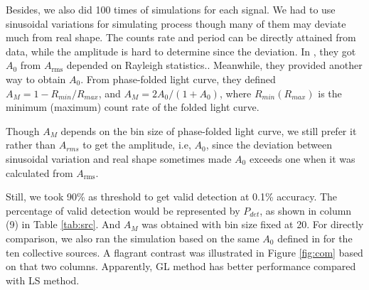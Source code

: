 \documentclass[fleqn,usenatbib]{mnras}
\begin{document}
Besides, we also did 100 times of simulations for each signal. We had to use sinusoidal variations for simulating process though many of them may deviate much from real shape. The counts rate and period can be directly attained from data, while the amplitude is hard to determine since the deviation. In \citet{2012ApJ...746..165H}, they got $A_0$ from $A_{\mathrm{rms}}$ depended on Rayleigh statistics.\citep{1983A&A...128..245B,2003ApJ...599..465M}.
Meanwhile, they provided another way to obtain $A_0$. From phase-folded light curve, they defined $A_{M}={1-R_{min}}/R_{max}$, and $A_{M}=2A_0/({1+A_0})$, where $R_{min}(R_{max})$ is the minimum (maximum) count rate of the folded light curve. 

Though $A_{M}$ depends on the bin size of phase-folded light curve, we still prefer it rather than $A_{rms}$ to get the amplitude, i.e, $A_0$, since the deviation between sinusoidal variation and real shape sometimes made $A_{0}$ exceeds one when it was calculated from $A_{\mathrm{rms}}$. 

Still, we took 90\% as threshold to get valid detection at 0.1\% accuracy. The percentage of valid detection would be represented by $P_{det}$, as shown in column (9) in Table \ref{tab:src}. And $A_{M}$ was obtained with bin size fixed at 20. For directly comparison, we also ran the simulation based on the same $A_{0}$ defined in \citet{2012ApJ...746..165H} for the ten collective sources. A flagrant contrast was illustrated in Figure \ref{fig:com} based on that two columns. Apparently, GL method has better performance compared with LS method.
\end{document}
